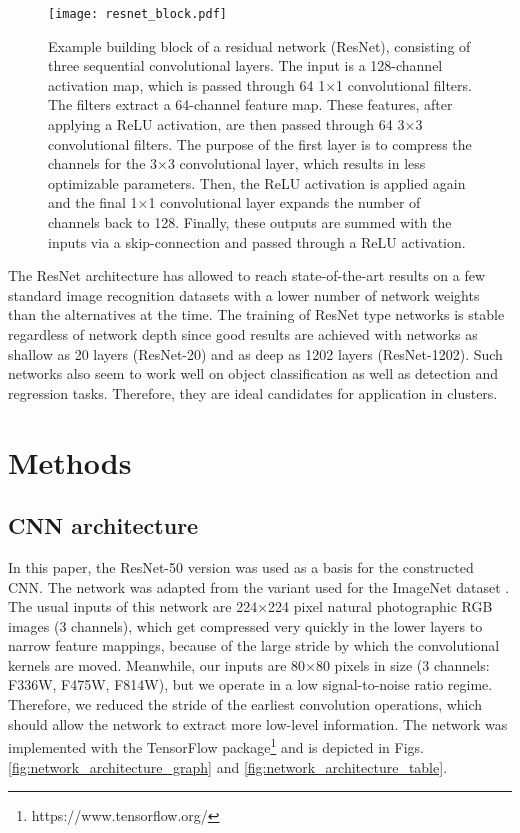\documentclass{aa}
\begin{document}
\begin{figure}
    \centering
        \texttt{[image: resnet\_block.pdf]}
    \caption{Example building block of a residual network (ResNet), consisting of three sequential convolutional layers. The input is a 128-channel activation map, which is passed through 64 1$\times$1 convolutional filters. The filters extract a 64-channel feature map. These features, after applying a ReLU activation, are then passed through 64 3$\times$3 convolutional filters. The purpose of the first layer is to compress the channels for the 3$\times$3 convolutional layer, which results in less optimizable parameters. Then, the ReLU activation is applied again and the final 1$\times$1 convolutional layer expands the number of channels back to 128. Finally, these outputs are summed with the inputs via a skip-connection and passed through a ReLU activation.}
    \label{fig:resnet_block}
\end{figure}

The ResNet architecture has allowed \cite{2015arXiv151203385H} to reach state-of-the-art results on a few standard image recognition datasets with a lower number of network weights than the alternatives at the time. The training of ResNet type networks is stable regardless of network depth since good results are achieved with networks as shallow as 20 layers (ResNet-20) and as deep as 1202 layers (ResNet-1202). Such networks also seem to work well on object classification as well as detection and regression tasks. Therefore, they are ideal candidates for application in clusters.

\section{Methods} \label{sec:method}
\subsection{CNN architecture}
In this paper, the ResNet-50 version was used as a basis for the constructed CNN. The network was adapted from the variant used for the ImageNet dataset \citep{ILSVRC15}. The usual inputs of this network are 224$\times$224 pixel natural photographic RGB images (3 channels), which get compressed very quickly in the lower layers to narrow feature mappings, because of the large stride by which the convolutional kernels are moved. Meanwhile, our inputs are 80$\times$80 pixels in size (3 channels: F336W, F475W, F814W), but we operate in a low signal-to-noise ratio regime. Therefore, we reduced the stride of the earliest convolution operations, which should allow the network to extract more low-level information. The network was implemented with the TensorFlow package\footnote{https://www.tensorflow.org/} and is depicted in Figs. \ref{fig:network_architecture_graph} and \ref{fig:network_architecture_table}.
\end{document}
